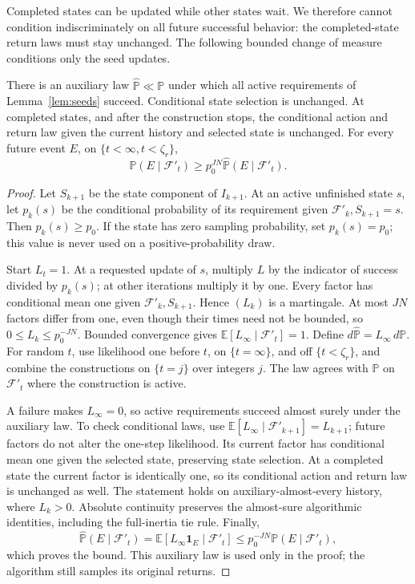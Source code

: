 Completed states can be updated while other states wait. We therefore cannot condition
indiscriminately on all future successful behavior: the completed-state return laws must stay
unchanged. The following bounded change of measure conditions only the seed updates.

\begin{lemma}\label{lem:measure}
There is an auxiliary law $\widehat{\mathbb P}\ll\mathbb P$
under which all active requirements of Lemma~\ref{lem:seeds} succeed. Conditional state selection is
unchanged. At completed states, and after the construction stops, the conditional action and
return law given the current history and selected state is unchanged. For every future event
$E$, on $\{t<\infty,t<\zeta_r\}$,
\begin{equation}\label{eq:transfer}
\mathbb P(E\mid\mathcal F'_t)\ge p_0^{JN}\widehat{\mathbb P}(E\mid\mathcal F'_t).
\end{equation}
\end{lemma}
\begin{proof}
Let $S_{k+1}$ be the state component of $I_{k+1}$. At an active unfinished state $s$, let
$p_k(s)$ be the conditional probability of its requirement given $\mathcal F'_k,S_{k+1}=s$. Then $p_k(s)\ge p_0$.
If the state has zero sampling probability, set $p_k(s)=p_0$; this value is never used on a
positive-probability draw.

Start $L_t=1$. At a requested update of $s$, multiply $L$ by the indicator of success divided
by $p_k(s)$; at other iterations multiply it by one. Every factor has conditional mean one given
$\mathcal F'_k,S_{k+1}$. Hence $(L_k)$ is a martingale. At most $JN$ factors differ from one, even though their
times need not be bounded, so $0\le L_k\le p_0^{-JN}$. Bounded convergence gives $\mathbb E[L_\infty\mid\mathcal F'_t]=1$.
Define $d\widehat{\mathbb P}=L_\infty\,d\mathbb P$. For random $t$, use likelihood one before $t$, on $\{t=\infty\}$, and off $\{t<\zeta_r\}$,
and combine the constructions on $\{t=j\}$ over integers $j$. The law agrees with $\mathbb P$ on $\mathcal F'_t$
where the construction is active.

A failure makes $L_\infty=0$, so active requirements succeed almost surely under the auxiliary
law. To check conditional laws, use $\mathbb E[L_\infty\mid\mathcal F'_{k+1}]=L_{k+1}$; future factors do not alter
the one-step likelihood. Its current factor has conditional mean one given the selected
state, preserving state selection. At a completed state the current factor is identically one,
so its conditional action and return law is unchanged as well. The statement holds on
auxiliary-almost-every history, where $L_k>0$. Absolute continuity preserves the almost-sure
algorithmic identities, including the full-inertia tie rule. Finally,
\[
\widehat{\mathbb P}(E\mid\mathcal F'_t)=\mathbb E[L_\infty\mathbf1_E\mid\mathcal F'_t]
\le p_0^{-JN}\mathbb P(E\mid\mathcal F'_t),
\]
which proves the bound. This auxiliary law is used only in the proof; the algorithm still
samples its original returns.
\end{proof}


